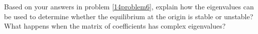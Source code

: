 \clearpage


\ii Based on your answers in problem \ref{14problem6}, explain how the eigenvalues can be used to determine whether the equilibrium at the origin is stable or unstable?  What happens when the matrix of coefficients has complex eigenvalues?\label{14problem7} 

\vfill

\ee







